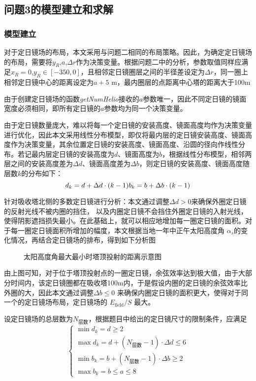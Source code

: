 \subsection{问题3的模型建立和求解}
\subsubsection{模型建立}
对于定日镜场的布局，本文采用与问题二相同的布局策略。因此，为确定定日镜场的布局，需要将\(y_{R}\),\(a\),\(\Delta r\)作为决策变量。根据问题二中的分析，参数取值同样应满足\(x_{R} = 0\),\(y_{R} \in [-350, 0]\)，且相邻定日镜圈层之间的半径差设定为\(\Delta r\)，同一圈上相邻定日镜中心的距离设定为\(a+5\) m，最内圈层的点距离中心塔的距离大于100m

由于创建定日镜场的函数{\it getNumHelio}接收的\(a\)参数唯一，因此不同定日镜的镜面宽度必须相同，即所有定日镜的\(a\)参数均为同一个决策变量。

由于定日镜数量庞大，难以将每一个定日镜的安装高度、镜面高度均作为决策变量进行优化，因此本文采用线性分布模型，即仅将最内层的定日镜安装高度、镜面高度作为决策变量，其余位置定日镜的安装高度、镜面高度、沿圆的径向作线性分布。若记最内层定日镜的安装高度为\(d\)、镜面高度为\(b\)，根据线性分布模型，相邻两层之间的安装高度差为\(\Delta d\)、镜面高度差为\(\Delta b\)，则定日镜的安装高度、镜面高度随层数\(k\)的分布如下：
\begin{equation}
d_{k} = d + \Delta d\cdot (k-1)\\
b_{k} = b + \Delta b\cdot (k-1)
\end{equation}

针对吸收塔北侧的多数定日镜进行分析：本文通过调整\(\Delta d > 0\)来确保外圈定日镜的反射光线不被内圈的挡住，
以及内圈定日镜不会挡住外圈定日镜的入射光线，使得阴影遮挡损失最小。在此基础上，就可以相应地增加每一圈定日镜的面积。对于每一圈定日镜面积所增加的幅度，本文根据当地一年中正午太阳高度角 \(\alpha_{s}\)的变化情况，再结合定日镜场的排布，得到如下分析图
\begin{figure}[H]
\centering

\caption{太阳高度角最大最小时塔顶投射的距离示意图}\label{30_70}
\end{figure}

由上图可知，对于位于塔顶投射点的一圈定日镜，余弦效率达到极大值，由于大部分时间内，该定日镜圈都在吸收塔100m内，于是假设内圈的定日镜的余弦效率比外圈的大，因此本文通过调整\(\Delta b \le 0\) 来确保内圈定日镜的面积更大，使得对于同一个的定日镜场布局，定日镜场的
\(E_{\mathrm{field}} / S\)
最大。


设定日镜场的总层数为\(N_{\text{层数}}\)，根据题目中给出的定日镜尺寸的限制条件，应满足
\[
\begin{cases}
\min d_{k} = d \ge 2\\
\max d_{k} = d + (N_{\text{层数}}-1) \cdot \Delta d \le 6\\
\min b_{k} = b + (N_{\text{层数}}-1) \cdot \Delta b \ge 2\\
\max b_{k} = b \le a \le 8
\end{cases}
\]

